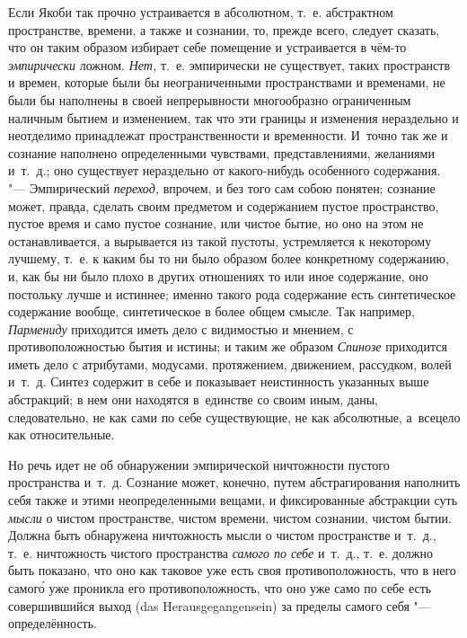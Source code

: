 Если Якоби так прочно устраивается в абсолютном, т.~е. абстрактном
пространстве, времени, а также и сознании, то, прежде всего, следует сказать,
что он таким образом избирает себе помещение и устраивается в чём-то
{\em эмпирически} ложном. {\em Нет,} т.~е. эмпирически не существует, таких
пространств и времен, которые были бы неограниченными пространствами и
временами, не были бы наполнены в своей непрерывности многообразно ограниченным
наличным бытием и изменением, так что эти границы и изменения нераздельно и
неотделимо принадлежат пространственности и временности. И~точно так же и
сознание наполнено определенными чувствами, представлениями, желаниями и~т.~д.;
оно существует нераздельно от какого-нибудь особенного содержания. "---
Эмпирический {\em переход,} впрочем, и без того сам собою понятен; сознание
может, правда, сделать своим предметом и содержанием пустое пространство,
пустое время и само пустое сознание, или чистое бытие, но оно на этом не
останавливается, а вырывается из такой пустоты, устремляется к некоторому
лучшему, т.~е. к каким бы то ни было образом более конкретному содержанию, и,
как бы ни было плохо в других отношениях то или иное содержание, оно постольку
лучше и истиннее; именно такого рода содержание есть синтетическое содержание
вообще, синтетическое в более общем смысле. Так например, {\em Пармениду}
приходится иметь дело с видимостью и мнением, с противоположностью бытия и
истины; и таким же образом {\em Спинозе} приходится иметь дело с атрибутами,
модусами, протяжением, движением, рассудком, волей и~т.~д. Синтез содержит в
себе и показывает неистинность указанных выше абстракций; в нем они находятся
в~единстве со своим иным, даны, следовательно, не как сами по себе
существующие, не как абсолютные, а~всецело как относительные.

Но речь идет не об обнаружении эмпирической ничтожности пустого пространства
и~т.~д. Сознание может, конечно, путем абстрагирования наполнить себя также и
этими неопределенными вещами, и фиксированные абстракции суть {\em мысли} о чистом
пространстве, чистом времени, чистом сознании, чистом бытии. Должна быть
обнаружена ничтожность мысли о чистом пространстве и~т.~д., т.~е. ничтожность чистого
пространства {\em самого по себе} и~т.~д., т.~е. должно быть показано,
что оно как таковое уже есть своя противоположность, что в него самог\'{о}
уже проникла его противоположность, что оно уже само по себе есть совершившийся
выход (das Heraus\-ge\-gan\-gen\-sein) за пределы самого себя "--- определённость.

